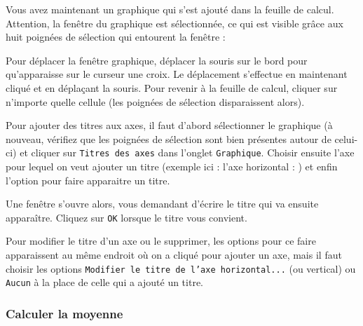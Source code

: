 Vous avez maintenant un graphique qui s'est ajouté dans la feuille de calcul. Attention, la fenêtre du graphique est sélectionnée, ce qui est visible grâce aux huit poignées de sélection qui entourent la fenêtre :


Pour déplacer la fenêtre graphique, déplacer la souris sur le bord pour qu'apparaisse sur le curseur une croix. Le déplacement s'effectue en maintenant cliqué et en déplaçant la souris. Pour revenir à la feuille de calcul, cliquer sur n'importe quelle cellule (les poignées de sélection disparaissent alors).


Pour ajouter des titres aux axes, il faut d'abord sélectionner le graphique (à nouveau, vérifiez que les poignées de sélection sont bien présentes autour de celui-ci) et cliquer sur \texttt{Titres des axes} dans l'onglet \texttt{Graphique}.  Choisir ensuite l'axe pour lequel on veut ajouter un titre (exemple ici : l'axe horizontal : ) et enfin l'option pour faire apparaitre un titre. 


Une fenêtre s'ouvre alors, vous demandant d'écrire le titre qui va ensuite apparaître. Cliquez sur \texttt{OK} lorsque le titre vous convient.

Pour modifier le titre d'un axe ou le supprimer, les options pour ce faire apparaissent au même endroit où on a cliqué pour ajouter un axe, mais il faut choisir les options \texttt{Modifier le titre de l'axe horizontal...} (ou vertical) ou \texttt{Aucun} à la place de celle qui a ajouté un titre.


\subsubsection{Calculer la moyenne}

